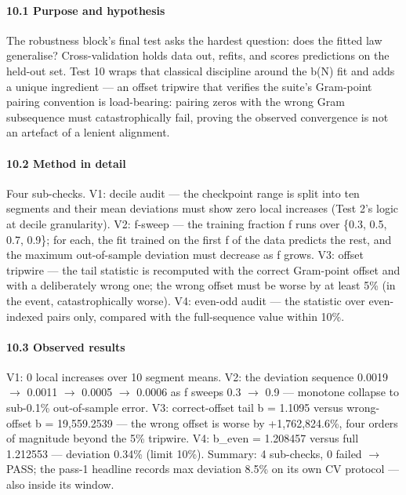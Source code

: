 \documentclass[10pt]{article}
\begin{document}
\paragraph{10.1 Purpose and hypothesis}

The robustness block's final test asks the hardest question: does the fitted law generalise? Cross-validation holds data out, refits, and scores predictions on the held-out set. Test 10 wraps that classical discipline around the b(N) fit and adds a unique ingredient --- an offset tripwire that verifies the suite's Gram-point pairing convention is load-bearing: pairing zeros with the wrong Gram subsequence must catastrophically fail, proving the observed convergence is not an artefact of a lenient alignment.

\paragraph{10.2 Method in detail}

Four sub-checks. V1: decile audit --- the checkpoint range is split into ten segments and their mean deviations must show zero local increases (Test 2's logic at decile granularity). V2: f-sweep --- the training fraction f runs over \{0.3, 0.5, 0.7, 0.9\}; for each, the fit trained on the first f of the data predicts the rest, and the maximum out-of-sample deviation must decrease as f grows. V3: offset tripwire --- the tail statistic is recomputed with the correct Gram-point offset and with a deliberately wrong one; the wrong offset must be worse by at least 5\% (in the event, catastrophically worse). V4: even-odd audit --- the statistic over even-indexed pairs only, compared with the full-sequence value within 10\%.

\paragraph{10.3 Observed results}

V1: 0 local increases over 10 segment means. V2: the deviation sequence 0.0019 $\rightarrow$ 0.0011 $\rightarrow$ 0.0005 $\rightarrow$ 0.0006 as f sweeps 0.3 $\rightarrow$ 0.9 --- monotone collapse to sub-0.1\% out-of-sample error. V3: correct-offset tail b = 1.1095 versus wrong-offset b = 19,559.2539 --- the wrong offset is worse by +1,762,824.6\%, four orders of magnitude beyond the 5\% tripwire. V4: b\_even = 1.208457 versus full 1.212553 --- deviation 0.34\% (limit 10\%). Summary: 4 sub-checks, 0 failed $\rightarrow$ PASS; the pass-1 headline records max deviation 8.5\% on its own CV protocol --- also inside its window.
\end{document}
